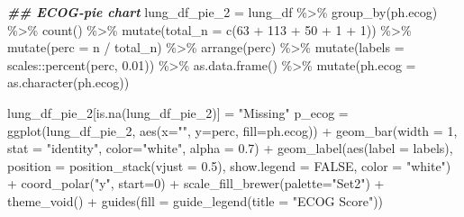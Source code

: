\documentclass[
]{article}
\newenvironment{Shaded}{\begin{snugshade}}{\end{snugshade}}
\newcommand{\AttributeTok}[1]{\textcolor[rgb]{0.77,0.63,0.00}{#1}}
\newcommand{\ConstantTok}[1]{\textcolor[rgb]{0.00,0.00,0.00}{#1}}
\newcommand{\DecValTok}[1]{\textcolor[rgb]{0.00,0.00,0.81}{#1}}
\newcommand{\DocumentationTok}[1]{\textcolor[rgb]{0.56,0.35,0.01}{\textbf{\textit{#1}}}}
\newcommand{\FloatTok}[1]{\textcolor[rgb]{0.00,0.00,0.81}{#1}}
\newcommand{\FunctionTok}[1]{\textcolor[rgb]{0.00,0.00,0.00}{#1}}
\newcommand{\NormalTok}[1]{#1}
\newcommand{\OtherTok}[1]{\textcolor[rgb]{0.56,0.35,0.01}{#1}}
\newcommand{\SpecialCharTok}[1]{\textcolor[rgb]{0.00,0.00,0.00}{#1}}
\newcommand{\StringTok}[1]{\textcolor[rgb]{0.31,0.60,0.02}{#1}}
\begin{document}
\begin{Shaded}
\begin{Highlighting}[]
\DocumentationTok{\#\# ECOG{-}pie chart}
\NormalTok{lung\_df\_pie\_2 }\OtherTok{=}\NormalTok{ lung\_df }\SpecialCharTok{\%\textgreater{}\%} 
  \FunctionTok{group\_by}\NormalTok{(ph.ecog) }\SpecialCharTok{\%\textgreater{}\%} 
  \FunctionTok{count}\NormalTok{() }\SpecialCharTok{\%\textgreater{}\%} 
  \FunctionTok{mutate}\NormalTok{(}\AttributeTok{total\_n =} \FunctionTok{c}\NormalTok{(}\DecValTok{63} \SpecialCharTok{+} \DecValTok{113} \SpecialCharTok{+} \DecValTok{50} \SpecialCharTok{+} \DecValTok{1} \SpecialCharTok{+} \DecValTok{1}\NormalTok{)) }\SpecialCharTok{\%\textgreater{}\%} 
  \FunctionTok{mutate}\NormalTok{(}\AttributeTok{perc =} \StringTok{\textasciigrave{}}\AttributeTok{n}\StringTok{\textasciigrave{}} \SpecialCharTok{/} \StringTok{\textasciigrave{}}\AttributeTok{total\_n}\StringTok{\textasciigrave{}}\NormalTok{) }\SpecialCharTok{\%\textgreater{}\%} 
  \FunctionTok{arrange}\NormalTok{(perc) }\SpecialCharTok{\%\textgreater{}\%}
  \FunctionTok{mutate}\NormalTok{(}\AttributeTok{labels =}\NormalTok{ scales}\SpecialCharTok{::}\FunctionTok{percent}\NormalTok{(perc, }\FloatTok{0.01}\NormalTok{)) }\SpecialCharTok{\%\textgreater{}\%}
  \FunctionTok{as.data.frame}\NormalTok{() }\SpecialCharTok{\%\textgreater{}\%}
  \FunctionTok{mutate}\NormalTok{(}\AttributeTok{ph.ecog =} \FunctionTok{as.character}\NormalTok{(ph.ecog)) }
         
\NormalTok{lung\_df\_pie\_2[}\FunctionTok{is.na}\NormalTok{(lung\_df\_pie\_2)] }\OtherTok{=} \StringTok{"Missing"}
\NormalTok{p\_ecog }\OtherTok{=} 
  \FunctionTok{ggplot}\NormalTok{(lung\_df\_pie\_2, }\FunctionTok{aes}\NormalTok{(}\AttributeTok{x=}\StringTok{""}\NormalTok{, }\AttributeTok{y=}\NormalTok{perc, }\AttributeTok{fill=}\NormalTok{ph.ecog)) }\SpecialCharTok{+} 
  \FunctionTok{geom\_bar}\NormalTok{(}\AttributeTok{width =} \DecValTok{1}\NormalTok{, }\AttributeTok{stat =} \StringTok{"identity"}\NormalTok{, }\AttributeTok{color=}\StringTok{"white"}\NormalTok{, }\AttributeTok{alpha =} \FloatTok{0.7}\NormalTok{) }\SpecialCharTok{+} 
  \FunctionTok{geom\_label}\NormalTok{(}\FunctionTok{aes}\NormalTok{(}\AttributeTok{label =}\NormalTok{ labels),}
             \AttributeTok{position =} \FunctionTok{position\_stack}\NormalTok{(}\AttributeTok{vjust =} \FloatTok{0.5}\NormalTok{),}
             \AttributeTok{show.legend =} \ConstantTok{FALSE}\NormalTok{,}
             \AttributeTok{color =} \StringTok{"white"}\NormalTok{) }\SpecialCharTok{+}
  \FunctionTok{coord\_polar}\NormalTok{(}\StringTok{"y"}\NormalTok{, }\AttributeTok{start=}\DecValTok{0}\NormalTok{) }\SpecialCharTok{+}
  \FunctionTok{scale\_fill\_brewer}\NormalTok{(}\AttributeTok{palette=}\StringTok{"Set2"}\NormalTok{) }\SpecialCharTok{+}
  \FunctionTok{theme\_void}\NormalTok{() }\SpecialCharTok{+}
  \FunctionTok{guides}\NormalTok{(}\AttributeTok{fill =} \FunctionTok{guide\_legend}\NormalTok{(}\AttributeTok{title =} \StringTok{"ECOG Score"}\NormalTok{))}


\end{Highlighting}
\end{Shaded}
\end{document}
